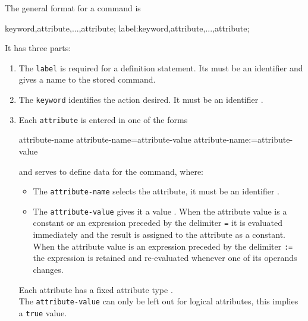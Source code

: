 The general format for a command is
\begin{example}
keyword,attribute,...,attribute;
label:keyword,attribute,...,attribute;
\end{example}
It has three parts:
\begin{enumerate}
\item The \texttt{label} is required for a definition statement.
  Its must be an identifier  and gives a name to the
  stored command.
\item The \texttt{keyword} identifies the action desired.
  It must be an identifier .
\item Each \texttt{attribute} is entered in one of the forms
\begin{example}
attribute-name
attribute-name=attribute-value
attribute-name:=attribute-value
\end{example}
and serves to define data for the command, where:
\begin{itemize}
\item The \texttt{attribute-name} selects the attribute,
  it must be an identifier .
\item The \texttt{attribute-value} gives it a value .
  When the attribute value is a constant or an expression preceded by
  the delimiter \texttt{=} it is evaluated immediately and the result
  is assigned to the attribute as a constant.
  When the attribute value is an expression preceded by the delimiter
  \texttt{:=} the expression is retained and re-evaluated whenever one
  of its operands changes.
\end{itemize}
Each attribute has a fixed attribute type .\\
The \texttt{attribute-value} can only be left out for logical
attributes, this implies a \texttt{true} value.
\end{enumerate}

